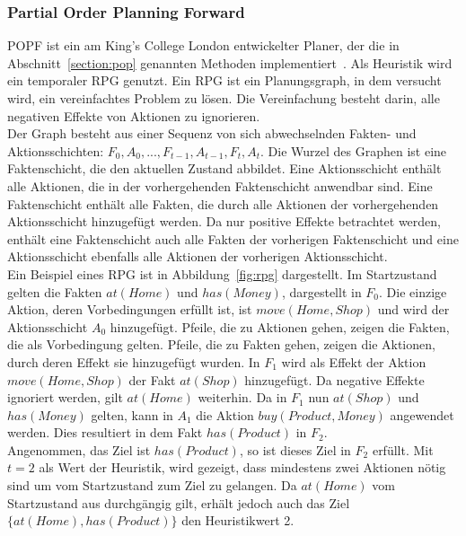 \subsubsection{Partial Order Planning Forward}
\ac{POPF} ist ein am King’s College London entwickelter Planer, der die in Abschnitt~\ref{section:pop} genannten Methoden implementiert~\citep{popf}.
Als Heuristik wird ein temporaler \acf{RPG} genutzt.
Ein \ac{RPG} ist ein Planungsgraph, in dem versucht wird, ein vereinfachtes Problem zu lösen.
Die Vereinfachung besteht darin, alle negativen Effekte von Aktionen zu ignorieren.\\
Der Graph besteht aus einer Sequenz von sich abwechselnden Fakten- und Aktionsschichten: $F_0, A_0, ..., F_{t-1}, A_{t-1}, F_t, A_t$.
Die Wurzel des Graphen ist eine Faktenschicht, die den aktuellen Zustand abbildet.
Eine Aktionsschicht enthält alle Aktionen, die in der vorhergehenden Faktenschicht anwendbar sind.
Eine Faktenschicht enthält alle Fakten, die durch alle Aktionen der vorhergehenden Aktionsschicht hinzugefügt werden.
Da nur positive Effekte betrachtet werden, enthält eine Faktenschicht auch alle Fakten der vorherigen Faktenschicht und eine Aktionsschicht ebenfalls alle Aktionen der vorherigen Aktionsschicht.\\
Ein Beispiel eines \ac{RPG} ist in Abbildung~\ref{fig:rpg} dargestellt.
Im Startzustand gelten die Fakten $at(Home)$ und $has(Money)$, dargestellt in $F_0$.
Die einzige Aktion, deren Vorbedingungen erfüllt ist, ist $move(Home, Shop)$ und wird der Aktionsschicht $A_0$ hinzugefügt.
Pfeile, die zu Aktionen gehen, zeigen die Fakten, die als Vorbedingung gelten.
Pfeile, die zu Fakten gehen, zeigen die Aktionen, durch deren Effekt sie hinzugefügt wurden.
In $F_1$ wird als Effekt der Aktion $move(Home, Shop)$ der Fakt $at(Shop)$ hinzugefügt.
Da negative Effekte ignoriert werden, gilt $at(Home)$ weiterhin.
Da in $F_1$ nun $at(Shop)$ und $has(Money)$ gelten, kann in $A_1$ die Aktion $buy(Product, Money)$ angewendet werden.
Dies resultiert in dem Fakt $has(Product)$ in $F_2$.\\
Angenommen, das Ziel ist $has(Product)$, so ist dieses Ziel in $F_2$ erfüllt.
Mit $t = 2$ als Wert der Heuristik, wird gezeigt, dass mindestens zwei Aktionen nötig sind um vom Startzustand zum Ziel zu gelangen.
Da $at(Home)$ vom Startzustand aus durchgängig gilt, erhält jedoch auch das Ziel $\{at(Home),has(Product)\}$ den Heuristikwert 2.\\
